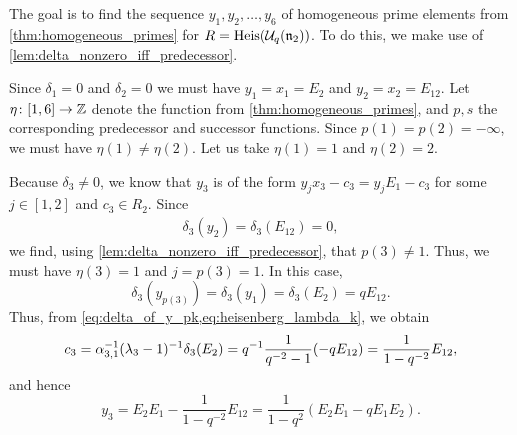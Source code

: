 \begin{example}\label{exmp:heisenberg_primes}

	The goal is to find the sequence $y_1, y_2, \dots, y_6$ of homogeneous prime elements
	from \cref{thm:homogeneous_primes} for $R = \operatorname{Heis}(\mathcal{U}_q(\mathfrak{n}_2))$. To do
	this, we make use of \cref{lem:delta_nonzero_iff_predecessor}.

	Since $\delta_1 = 0$ and $\delta_2 = 0$ we must have $y_1 = x_1 = E_2$ and $y_2 = x_2 =
		E_{12}$. Let $\eta \colon [1, 6] \to \mathbb{Z}$ denote the function from
	\cref{thm:homogeneous_primes}, and $p,s$ the corresponding predecessor and successor
	functions. Since $p(1) = p(2) = -\infty$, we must have $\eta(1) \neq \eta(2)$. Let us
	take $\eta(1) = 1$ and $\eta(2) = 2$.

	Because $\delta_3 \neq 0$, we know that $y_3$ is of the form $y_j x_3 - c_3 = y_j E_1 -
		c_3$ for some $j \in [1,2]$ and $c_3 \in R_{2}$. Since
	\begin{align*}
		\delta_3(y_2) = \delta_3(E_{12}) = 0,
	\end{align*}
	we find, using \cref{lem:delta_nonzero_iff_predecessor}, that $p(3) \neq 1$. Thus, we
	must have $\eta(3) = 1$ and $j = p(3) = 1$. In this case,
	\begin{equation*}
		\delta_3(y_{p(3)}) = \delta_3(y_1) = \delta_3(E_2) = q E_{12}.
	\end{equation*}
	Thus, from \cref{eq:delta_of_y_pk,eq:heisenberg_lambda_k}, we obtain
	\begin{equation*}
		c_3 = \alpha_{3,1}^{-1} (\lambda_3-1)^{-1} \delta_3(E_2) = q^{-1} \frac{1}{q^{-2}-1}(-q E_{12}) = \frac{1}{1 - q^{-2}}E_{12},
	\end{equation*}
	and hence
	\begin{equation*}
		y_3 = E_2 E_1 - \frac{1}{1-q^{-2}}E_{12} = \frac{1}{1-q^2}(E_2 E_1 - q E_1 E_2).
	\end{equation*}


\end{example}
